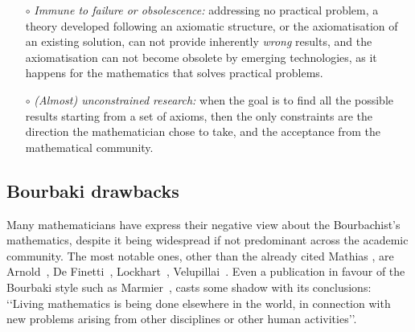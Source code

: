 \documentclass[]{scrartcl}
\theoremstyle{definition}
\begin{document}
\begin{itemize}
    \item[$\circ$] \emph{Immune to failure or obsolescence:} addressing no practical problem, a theory developed following an axiomatic structure, or the axiomatisation of an existing solution, can not provide inherently \emph{wrong} results, and the axiomatisation can not become obsolete by emerging technologies, as it happens for the mathematics that solves practical problems.
    
    \item[$\circ$] \emph{(Almost) unconstrained research:} when the goal is to find all the possible results starting from a set of axioms, then the only constraints are the direction the mathematician chose to take, and the acceptance from the mathematical community.
     
\end{itemize}

\subsection*{Bourbaki drawbacks}

Many mathematicians have express their negative view about the Bourbachist's mathematics, despite it being widespread if not predominant across the academic community. The most notable ones, other than the already cited Mathias \cite{mathias1992ignorance}, are Arnold~\cite{arnol1998teaching}, De Finetti~\cite{de2008bruno}, Lockhart~\cite{lockhart2009mathematician}, Velupillai~\cite{velupillai2012bourbaki}. Even a publication in favour of the Bourbaki style such as Marmier~\cite{marmier2014idea}, casts some shadow with its conclusions: \lq\lq Living mathematics is being done elsewhere in the world, in connection with new problems arising from other disciplines or other human activities\rq\rq.
\end{document}
